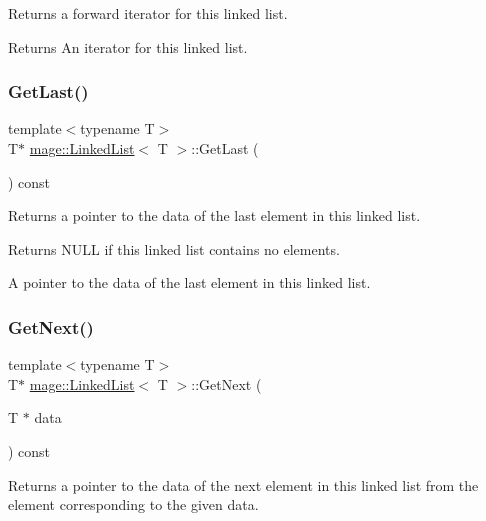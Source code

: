 Returns a forward iterator for this linked list.

\begin{DoxyReturn}{Returns}
An iterator for this linked list. 
\end{DoxyReturn}
\hypertarget{classmage_1_1_linked_list_a734f6dc6d073edd99eb9a0ac1f605900}{}\label{classmage_1_1_linked_list_a734f6dc6d073edd99eb9a0ac1f605900} 
\subsubsection{\texorpdfstring{Get\+Last()}{GetLast()}}
{\footnotesize\ttfamily template$<$typename T$>$ \\
T$\ast$ \hyperlink{classmage_1_1_linked_list}{mage\+::\+Linked\+List}$<$ T $>$\+::Get\+Last (\begin{DoxyParamCaption}{ }\end{DoxyParamCaption}) const}

Returns a pointer to the data of the last element in this linked list.

\begin{DoxyReturn}{Returns}
{\ttfamily N\+U\+LL} if this linked list contains no elements. 

A pointer to the data of the last element in this linked list. 
\end{DoxyReturn}
\hypertarget{classmage_1_1_linked_list_a992390dbc48cf24705f9e79baef37061}{}\label{classmage_1_1_linked_list_a992390dbc48cf24705f9e79baef37061} 
\subsubsection{\texorpdfstring{Get\+Next()}{GetNext()}}
{\footnotesize\ttfamily template$<$typename T$>$ \\
T$\ast$ \hyperlink{classmage_1_1_linked_list}{mage\+::\+Linked\+List}$<$ T $>$\+::Get\+Next (\begin{DoxyParamCaption}\item[{T $\ast$}]{data }\end{DoxyParamCaption}) const}

Returns a pointer to the data of the next element in this linked list from the element corresponding to the given data.


